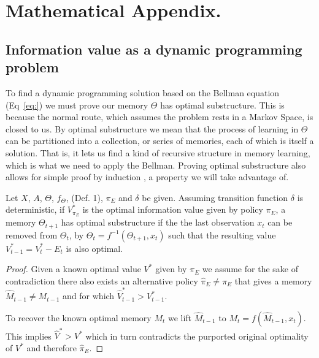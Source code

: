 \section*{Mathematical Appendix.}
\newcommand{\beginsupplement}{%
        \setcounter{table}{0}
        \renewcommand{\thetable}{S\arabic{table}}%
        \setcounter{figure}{0}
        \renewcommand{\thefigure}{S\arabic{figure}}%
     }
\beginsupplement
\setcounter{theorem}{0}


\subsection*{Information value as a dynamic programming problem} To find a dynamic programming solution based on the Bellman equation (Eq~\ref{eq:}) we must prove our memory $\Theta$ has optimal substructure. This is because the normal route, which assumes the problem rests in a Markov Space, is closed to us. By optimal substructure we mean that the process of learning in $\Theta$ can be partitioned into a collection, or series of memories, each of which is itself a solution. That is, it lets us find a kind of recursive structure in memory learning, which is what we need to apply the Bellman. Proving optimal substructure also allows for simple proof by induction \citep{Roughgarden2019}, a property we will take advantage of. 

\begin{theorem} \label{theorem:opt_sub} 
    Let $X$, $A$, $\Theta$, $f_{\Theta}$, (Def. 1), $\pi_E$ and $\delta$ be given. Assuming transition function $\delta$ is deterministic, if $V^*_{\pi_E}$ is the optimal information value given by policy $\pi_E$, a memory $\Theta_{t+1}$ has optimal substructure if the the last observation $x_t$ can be removed from $\Theta_t$, by $\Theta_{t} = f^{-1}(\Theta_{t+1}, x_t)$ such that the resulting value $V^*_{t-1} = V^*_{t} - E_{t}$ is also optimal. 
\end{theorem}
\begin{proof}
	Given a known optimal value $V^*$ given by $\pi_E$ we assume for the sake of contradiction there also exists an alternative policy $\hat \pi_E \neq \pi_E$ that gives a memory $\hat M_{t-1} \neq M_{t-1}$ and for which $\hat V^*_{t-1} > V^*_{t-1}$. 
	
	To recover the known optimal memory $M_t$ we lift $\hat M_{t-1}$ to $M_t = f(\hat M_{t-1}, x_t)$. This implies $\hat V^* > V^*$ which in turn contradicts the purported original optimality of $V^*$ and therefore $\hat \pi_E$.
\end{proof}

